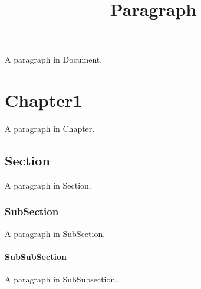 \documentclass[a4paper,11pt,oneside,openany,report]{jsbook}
\title{Paragraph}
\begin{document}
\maketitle
A paragraph in Document.

\chapter{Chapter1}\label{ch:Chapter1}
A paragraph in Chapter.

\section{Section}\label{sec:Chapter1/Section}
A paragraph in Section.

\subsection{SubSection}\label{subsec:Chapter1/Section/SubSection}
A paragraph in SubSection.

\subsubsection{SubSubSection}\label{subsubsec:Chapter1/Section/SubSection/SubSubSection}
A paragraph in SubSubsection.
\end{document}
